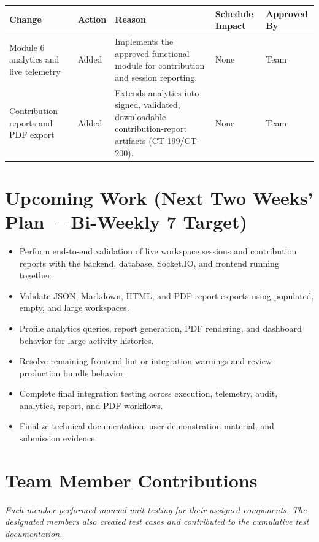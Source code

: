 \documentclass[11pt,a4paper]{article}
\begin{document}
\small
\begin{tabularx}{\textwidth}{p{2.6cm} p{1.1cm} Y p{1.35cm} p{1.25cm}}
\toprule
\textbf{Change} & \textbf{Action} & \textbf{Reason} & \textbf{Schedule Impact} & \textbf{Approved By} \\
\midrule
Module 6 analytics and live telemetry & Added & Implements the approved functional module for contribution and session reporting. & None & Team \\
Contribution reports and PDF export & Added & Extends analytics into signed, validated, downloadable contribution-report artifacts (CT-199/CT-200). & None & Team \\
\bottomrule
\end{tabularx}
\normalsize

\section{Upcoming Work (Next Two Weeks' Plan~-- Bi-Weekly 7 Target)}

\begin{itemize}
    \item Perform end-to-end validation of live workspace sessions and contribution reports with the backend, database, Socket.IO, and frontend running together.
    \item Validate JSON, Markdown, HTML, and PDF report exports using populated, empty, and large workspaces.
    \item Profile analytics queries, report generation, PDF rendering, and dashboard behavior for large activity histories.
    \item Resolve remaining frontend lint or integration warnings and review production bundle behavior.
    \item Complete final integration testing across execution, telemetry, audit, analytics, report, and PDF workflows.
    \item Finalize technical documentation, user demonstration material, and submission evidence.
\end{itemize}

\section{Team Member Contributions}

\textit{Each member performed manual unit testing for their assigned components. The designated members also created test cases and contributed to the cumulative test documentation.}
\end{document}
